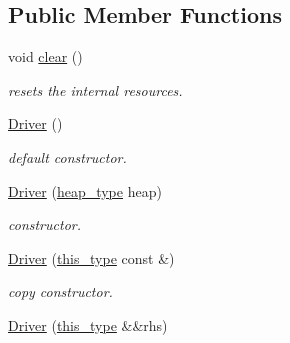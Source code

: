 \subsection*{Public Member Functions}
\begin{DoxyCompactItemize}
\item 
\hypertarget{classhryky_1_1display_1_1_driver_aff53c2a21c0d8a93efb615de210fc2da}{void \hyperlink{classhryky_1_1display_1_1_driver_aff53c2a21c0d8a93efb615de210fc2da}{clear} ()}\label{classhryky_1_1display_1_1_driver_aff53c2a21c0d8a93efb615de210fc2da}

\begin{DoxyCompactList}\small\item\em resets the internal resources. \end{DoxyCompactList}\item 
\hypertarget{classhryky_1_1display_1_1_driver_aa9b8c36963b5adbd5e683a889392aaa7}{\hyperlink{classhryky_1_1display_1_1_driver_aa9b8c36963b5adbd5e683a889392aaa7}{Driver} ()}\label{classhryky_1_1display_1_1_driver_aa9b8c36963b5adbd5e683a889392aaa7}

\begin{DoxyCompactList}\small\item\em default constructor. \end{DoxyCompactList}\item 
\hypertarget{classhryky_1_1display_1_1_driver_a9b1569740af15b7ff46c46c60b9c89dc}{\hyperlink{classhryky_1_1display_1_1_driver_a9b1569740af15b7ff46c46c60b9c89dc}{Driver} (\hyperlink{classhryky_1_1memory_1_1heap_1_1_base}{heap\-\_\-type} heap)}\label{classhryky_1_1display_1_1_driver_a9b1569740af15b7ff46c46c60b9c89dc}

\begin{DoxyCompactList}\small\item\em constructor. \end{DoxyCompactList}\item 
\hypertarget{classhryky_1_1display_1_1_driver_a7457af61e45c5c72cbc53adb3eea89b5}{\hyperlink{classhryky_1_1display_1_1_driver_a7457af61e45c5c72cbc53adb3eea89b5}{Driver} (\hyperlink{classhryky_1_1display_1_1_driver_aeed838549fff082eceb3504a3b701fb5}{this\-\_\-type} const \&)}\label{classhryky_1_1display_1_1_driver_a7457af61e45c5c72cbc53adb3eea89b5}

\begin{DoxyCompactList}\small\item\em copy constructor. \end{DoxyCompactList}\item 
\hypertarget{classhryky_1_1display_1_1_driver_a275025332379f3f51374c18d4c2e557c}{\hyperlink{classhryky_1_1display_1_1_driver_a275025332379f3f51374c18d4c2e557c}{Driver} (\hyperlink{classhryky_1_1display_1_1_driver_aeed838549fff082eceb3504a3b701fb5}{this\-\_\-type} \&\&rhs)}\label{classhryky_1_1display_1_1_driver_a275025332379f3f51374c18d4c2e557c}


\end{DoxyCompactItemize}
